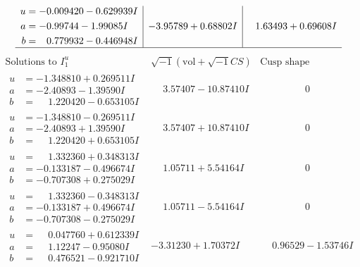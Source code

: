 \documentclass[1p]{elsarticle_modified}
\theoremstyle{definition}
\newcommand{\I}{\sqrt{-1}}
\begin{document}
$$\begin{array}{c|c|c}
\begin{aligned}
u &= -0.009420 - 0.629939 I \\
a &= -0.99744 - 1.99085 I \\
b &= \phantom{-}0.779932 - 0.446948 I\end{aligned}
 & -3.95789 + 0.68802 I & \phantom{-}1.63493 + 0.69608 I\\
 \hline 
 \end{array}$$\newpage$$\begin{array}{c|c|c}  
\text{Solutions to }I^u_{1}& \I (\text{vol} + \sqrt{-1}CS) & \text{Cusp shape}\\
 \hline 
\begin{aligned}
u &= -1.348810 + 0.269511 I \\
a &= -2.40893 - 1.39590 I \\
b &= \phantom{-}1.220420 - 0.653105 I\end{aligned}
 & \phantom{-}3.57407 - 10.87410 I & \phantom{-0.000000 } 0 \\ \hline\begin{aligned}
u &= -1.348810 - 0.269511 I \\
a &= -2.40893 + 1.39590 I \\
b &= \phantom{-}1.220420 + 0.653105 I\end{aligned}
 & \phantom{-}3.57407 + 10.87410 I & \phantom{-0.000000 } 0 \\ \hline\begin{aligned}
u &= \phantom{-}1.332360 + 0.348313 I \\
a &= -0.133187 - 0.496674 I \\
b &= -0.707308 + 0.275029 I\end{aligned}
 & \phantom{-}1.05711 + 5.54164 I & \phantom{-0.000000 } 0 \\ \hline\begin{aligned}
u &= \phantom{-}1.332360 - 0.348313 I \\
a &= -0.133187 + 0.496674 I \\
b &= -0.707308 - 0.275029 I\end{aligned}
 & \phantom{-}1.05711 - 5.54164 I & \phantom{-0.000000 } 0 \\ \hline\begin{aligned}
u &= \phantom{-}0.047760 + 0.612339 I \\
a &= \phantom{-}1.12247 - 0.95080 I \\
b &= \phantom{-}0.476521 - 0.921710 I\end{aligned}
 & -3.31230 + 1.70372 I & \phantom{-}0.96529 - 1.53746 I \\ \hline\begin{aligned}

\end{aligned}
\end{array}$$
\end{document}
